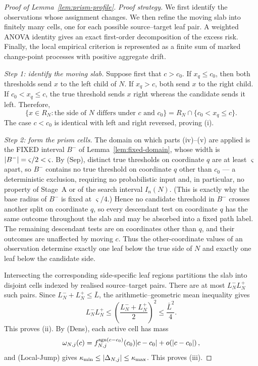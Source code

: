 \documentclass[11pt]{article}
\theoremstyle{plain}
\theoremstyle{definition}
\theoremstyle{remark}
\DeclarePairedDelimiter{\abs}{\lvert}{\rvert}
\begin{document}
\begin{proof}[Proof of Lemma~\ref{lem:prism-profile}]
\emph{Proof strategy.}
We first identify the observations whose assignment changes.  We then refine
the moving slab into finitely many cells, one for each possible source--target
leaf pair.  A weighted ANOVA identity gives an exact first-order
decomposition of the excess risk.  Finally, the local empirical criterion is
represented as a finite sum of marked change-point processes with positive
aggregate drift.

\emph{Step 1: identify the moving slab.}
Suppose first that \(c>c_0\).  If \(x_q\le c_0\), then both thresholds send
\(x\) to the left child of \(N\).  If \(x_q>c\), both send \(x\) to the right
child.  If \(c_0<x_q\le c\), the true threshold sends \(x\) right whereas the
candidate sends it left.  Therefore,
\[
  \bigl\{x\in R_N:
    \text{the side of \(N\) differs under \(c\) and \(c_0\)}
  \bigr\}
  =
  R_N\cap\{c_0<x_q\le c\}.
\]
The case \(c<c_0\) is identical with left and right reversed, proving (i).

\emph{Step 2: form the prism cells.}
The domain on which parts (iv)--(v) are applied is the FIXED interval $B^-$ of
Lemma~\ref{lem:fixed-domain}, whose width is
$\abs{B^-}=\varsigma/2<\varsigma$. By (Sep), distinct true thresholds on
coordinate \(q\) are at least \(\varsigma\) apart, so \(B^-\) contains no true
threshold on coordinate \(q\) other than \(c_0\) --- a deterministic
exclusion, requiring no probabilistic input and, in particular, no property of
Stage~A or of the search interval \(I_n(N)\). (This is exactly why the base
radius of \(B^-\) is fixed at \(\varsigma/4\).) Hence no candidate threshold
in \(B^-\) crosses another split on coordinate \(q\), so
every descendant test on coordinate \(q\) has the same outcome
throughout the slab and may be absorbed into a fixed path label.  The
remaining descendant tests are on coordinates other than \(q\), and their
outcomes are unaffected by moving \(c\).  Thus the other-coordinate values of
an observation determine exactly one leaf below the true side of \(N\) and
exactly one leaf below the candidate side.

Intersecting the corresponding side-specific leaf regions partitions the
slab into disjoint cells indexed by realised source--target pairs.  There are
at most \(L_N^-L_N^+\) such pairs.  Since
\(L_N^-+L_N^+\le\bar L\), the arithmetic--geometric mean inequality gives
\[
  L_N^-L_N^+
  \le
  \left(\frac{L_N^-+L_N^+}{2}\right)^2
  \le \frac{\bar L^2}{4}.
\]
This proves (ii).  By (Dens), each active cell has mass
\[
  \omega_{N,j}(c)
  =
  f_{N,j}^{\operatorname{sgn}(c-c_0)}(c_0)
  \abs{c-c_0}
  +o\!\left(\abs{c-c_0}\right),
\]
and (Local-Jump) gives
\(\kappa_{\min}\le\abs{\Delta_{N,j}}\le\kappa_{\max}\).
This proves (iii).


\end{proof}
\end{document}
